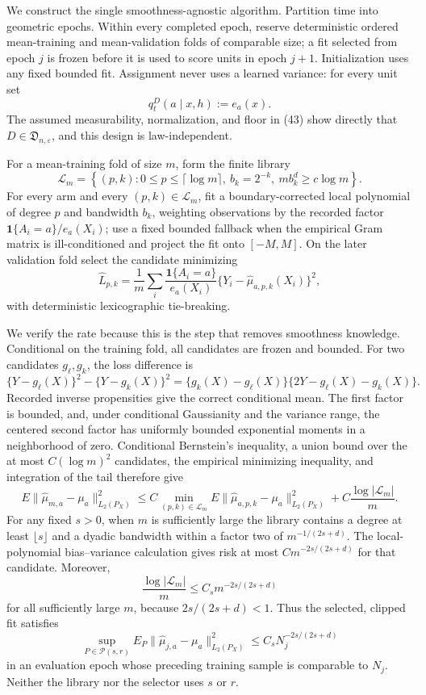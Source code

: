We construct the single smoothness-agnostic algorithm. Partition time into geometric epochs. Within every completed epoch, reserve deterministic ordered mean-training and mean-validation folds of comparable size; a fit selected from epoch \(j\) is frozen before it is used to score units in epoch \(j+1\). Initialization uses any fixed bounded fit. Assignment never uses a learned variance: for every unit set
\[
q_t^D(a\mid x,h):=e_a(x).
\tag{45}
\]
The assumed measurability, normalization, and floor in (43) show directly that \(D\in\mathfrak D_{n,\varepsilon}\), and this design is law-independent.

For a mean-training fold of size \(m\), form the finite library
\[
\mathcal L_m=
\left\{(p,k):0\leq p\leq\lceil\log m\rceil,
\ b_k=2^{-k},\ mb_k^d\geq c\log m\right\}.
\tag{46}
\]
For every arm and every \((p,k)\in\mathcal L_m\), fit a boundary-corrected local polynomial of degree \(p\) and bandwidth \(b_k\), weighting observations by the recorded factor \(\mathbf1\{A_i=a\}/e_a(X_i)\); use a fixed bounded fallback when the empirical Gram matrix is ill-conditioned and project the fit onto \([-M,M]\). On the later validation fold select the candidate minimizing
\[
\widehat L_{p,k}
=\frac1m\sum_i
\frac{\mathbf1\{A_i=a\}}{e_a(X_i)}
\{Y_i-\widehat\mu_{a,p,k}(X_i)\}^2,
\tag{47}
\]
with deterministic lexicographic tie-breaking.

We verify the rate because this is the step that removes smoothness knowledge. Conditional on the training fold, all candidates are frozen and bounded. For two candidates \(g_\ell,g_k\), the loss difference is
\[
\{Y-g_\ell(X)\}^2-\{Y-g_k(X)\}^2
=\{g_k(X)-g_\ell(X)\}\{2Y-g_\ell(X)-g_k(X)\}.
\tag{48}
\]
Recorded inverse propensities give the correct conditional mean. The first factor is bounded, and, under conditional Gaussianity and the variance range, the centered second factor has uniformly bounded exponential moments in a neighborhood of zero. Conditional Bernstein's inequality, a union bound over the at most \(C(\log m)^2\) candidates, the empirical minimizing inequality, and integration of the tail therefore give
\[
E\|\widehat\mu_{m,a}-\mu_a\|_{L_2(P_X)}^2
\leq C\min_{(p,k)\in\mathcal L_m}
E\|\widehat\mu_{a,p,k}-\mu_a\|_{L_2(P_X)}^2
+C\frac{\log|\mathcal L_m|}{m}.
\tag{49}
\]
For any fixed \(s>0\), when \(m\) is sufficiently large the library contains a degree at least \(\lfloor s\rfloor\) and a dyadic bandwidth within a factor two of \(m^{-1/(2s+d)}\). The local-polynomial bias--variance calculation gives risk at most \(Cm^{-2s/(2s+d)}\) for that candidate. Moreover,
\[
\frac{\log|\mathcal L_m|}{m}
\leq C_s m^{-2s/(2s+d)}
\tag{50}
\]
for all sufficiently large \(m\), because \(2s/(2s+d)<1\). Thus the selected, clipped fit satisfies
\[
\sup_{P\in\mathcal P(s,r)}
E_P\|\widehat\mu_{j,a}-\mu_a\|_{L_2(P_X)}^2
\leq C_s N_j^{-2s/(2s+d)}
\tag{51}
\]
in an evaluation epoch whose preceding training sample is comparable to \(N_j\). Neither the library nor the selector uses \(s\) or \(r\).

